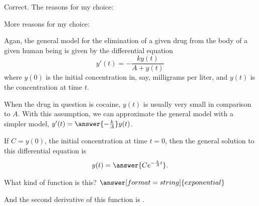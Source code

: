 \documentclass{ximera}
\begin{document}
\begin{question}
\begin{question}
Correct.  The reasons for my choice:  
\begin{selectAll}
\end{selectAll}

More reasons for my choice: 
\begin{selectAll}
\end{selectAll}
\end{question}
\end{question}


Agan, the general model for  the elimination of a given drug from the body of a given human being is given by the differential equation 
$$y'(t)=-\frac{ky(t)}{A+y(t)}$$
where $y(0)$ is the initial concentration in, say, milligrams per liter, and $y(t)$ is the concentration at time $t$. 

\begin{question}
When the drug in question is cocaine, $y(t)$ is usually very small in comparison to $A$.   With this assumption, we can approximate the general model with a simpler model, $y'(t)=\answer{-\frac{k}{A}}y(t)$.    

If $C=y(0)$, the initial concentration at time $t=0$, then the general solution to this differential equation is 
\[  
y(t) =\answer{Ce^{-\frac{k}{A}t}}. 
\]

What kind of function is this? $\answer[format=string]{exponential}$

And the second derivative of this function is .  
\end{question}
\end{document}

